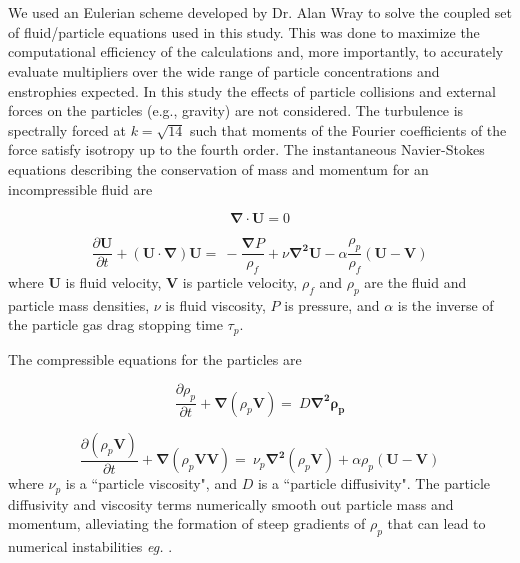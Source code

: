 \documentclass[aps,pra,twocolumn,groupedaddress,showkeys,showpacs,floatfix]{revtex4}
\begin{document}
\appendix*
\section{} 
   We used an Eulerian scheme developed by Dr. Alan Wray    
to solve the coupled set of    fluid/particle equations used in this study.
This was done to    maximize the computational efficiency of the calculations
and, more    importantly, to accurately evaluate multipliers over the wide   
range of particle concentrations and enstrophies expected.    In this study the
effects of particle collisions and external forces on the    particles (e.g., gravity)
are not considered. The turbulence is spectrally forced at $k = \sqrt{14}$ such that 
moments of the Fourier coefficients of the force satisfy isotropy up to the fourth
order.  
The instantaneous Navier-Stokes equations describing the conservation of
mass and    momentum for an incompressible fluid are

\begin{equation}
  \mathbf{\nabla \cdot U} = 0  \label{a1}
\end{equation}

\begin{equation}
  \frac{\partial{\mathbf{U}}}{\partial{t}} + \mathbf{(U \cdot \nabla ) U} = \
   - \frac{\mathbf{\nabla} P }{\rho_f} + \nu \mathbf{\nabla^2 U} - \alpha 
\frac{\rho_p}{\rho_f} 
   \mathbf{(U - V)} \label{a2}
\end{equation}
where $\mathbf{U}$ is fluid velocity, $\mathbf{V}$ is particle velocity, $\rho_f$ and $\rho_p$ 
are the fluid and
particle mass densities, $\nu$ is fluid viscosity, $P$ is pressure, and
$\alpha$ is the inverse of the particle gas drag stopping time $\tau_p$.

 The compressible equations for the particles are 

\begin{equation}
  \frac{\partial{\rho_p}}{\partial{t}} + \mathbf{\nabla}(\rho_p\mathbf{V}) = \
  D\mathbf{\nabla^2 \rho_p} \label{a3}
\end{equation}

\begin{equation}
  \frac{\partial{(\rho_p \mathbf{V})}}{\partial{t}} + \mathbf{\nabla}(\rho_p 
\mathbf{VV}) = \
  \nu_p\mathbf{\nabla^2}(\rho_p \mathbf{V}) + \alpha \rho_p \mathbf{(U - V)} \label{a4} 
\end{equation}
   where $\nu_p$ is a ``particle 
viscosity", and  $D$ is 
a ``particle diffusivity".
   The particle diffusivity and viscosity terms numerically smooth out particle 
mass and 
   momentum, alleviating the formation of steep gradients of $\rho_p$ that can 
lead to 
   numerical instabilities {\it eg.} \cite{Johansen:1}.
\end{document}
